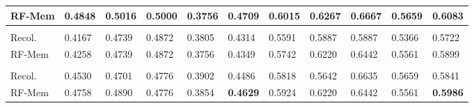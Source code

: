 \begin{table}[h]
\begin{tabular}{p{1.3cm}|M{1.2cm}M{1.2cm}M{1.2cm}M{1.2cm}>{}M{1.1cm}
                            |M{1.2cm}M{1.2cm}M{1.2cm}M{1.2cm}>{}M{1.1cm}}
                RF-Mem
                 & 0.4848 & 0.5016 & 0.5000 & 0.3756 & \textbf{0.4709}
                 & 0.6015 & 0.6267 & 0.6667 & 0.5659 & \textbf{0.6083} \\
                 
                \midrule
                 \\
                Recol.
                 & 0.4167 & 0.4739 & 0.4872 & 0.3805 & 0.4314 
                 & 0.5591 & 0.5887 & 0.5887 & 0.5366 & 0.5722 \\
                
                RF-Mem
                 & 0.4258 & 0.4739 & 0.4872 & 0.3756 & 0.4349
                 & 0.5742 & 0.6220 & 0.6442 & 0.5561 & 0.5899\\

                \midrule
                 \\
                Recol.
                 & 0.4530 & 0.4701 & 0.4776 & 0.3902 & 0.4486
                 & 0.5818 & 0.5642 & 0.6635 & 0.5659 & 0.5841 \\
                
                RF-Mem 
                 & 0.4758 & 0.4890 & 0.4776 & 0.3854 & \textbf{0.4629}
                 & 0.5924 & 0.6220 & 0.6442 & 0.5561 & \textbf{0.5986} \\
                 
        \bottomrule
        \end{tabular}
\vspace{-10pt}
\end{table}


